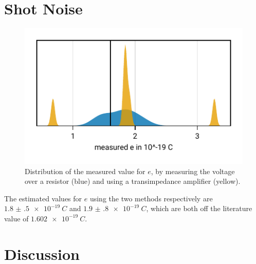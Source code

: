 \documentclass[
    parskip=half, 
    twoside=false,
    twocolumn=true,
    fontsize=11pt,
]{scrarticle}
\begin{document}
\section{Shot Noise}
\begin{figure}[h!]
    \centering
    \includegraphics{figures/03 shot noise.pdf}
    \caption{
        Distribution of the measured value for $e$, by measuring the voltage over a resistor (blue) and using a transimpedance amplifier (yellow).
    }
    \label{fig:shot noise}
\end{figure}
The estimated values for $e$ using the two methods respectively are $\SI{1.8(5)e-19}{C}$ and $\SI{1.9(8)e-19}{C}$, which are both off the literature value of $\SI{1.602e-19}{C}$.

\pagebreak
\section{Discussion}
\end{document}
